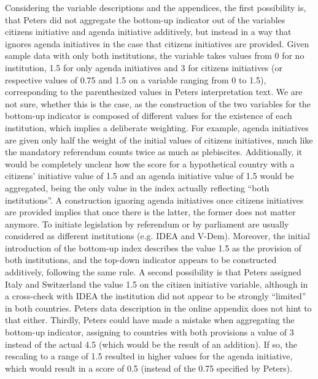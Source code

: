 \documentclass{systats}
\begin{document}
Considering the variable descriptions and the appendices, the first possibility is, that Peters did not aggregate the bottom-up indicator out of the variables citizens initiative and agenda initiative additively, but instead in a way that ignores agenda initiatives in the case that citizens initiatives are provided. Given sample data with only both institutions, the variable takes values from 0 for no institution, 1.5 for only agenda initiatives and 3 for citizens initiatives (or respective values of 0.75 and 1.5 on a variable ranging from 0 to 1.5), corresponding to the parenthesized values in Peters interpretation text. We are not sure, whether this is the case, as the construction of the two variables for the bottom-up indicator is composed of different values for the existence of each institution, which implies a deliberate weighting. For example, agenda initiatives are given only half the weight of the initial values of citizens initiatives, much like the mandatory referendum counts twice as much as plebiscites. Additionally, it would be completely unclear how the score for a hypothetical country with a citizens’ initiative value of 1.5 and an agenda initiative value of 1.5 would be aggregated, being the only value in the index actually reflecting “both institutions”. A construction ignoring agenda initiatives once citizens initiatives are provided implies that once there is the latter, the former does not matter anymore. To initiate legislation by referendum or by parliament are usually considered as different institutions (e.g. IDEA and V-Dem). Moreover, the initial introduction of the bottom-up index describes the value 1.5 as the provision of both institutions, and the top-down indicator appears to be constructed additively, following the same rule. A second possibility is that Peters assigned Italy and Switzerland the value 1.5 on the citizen initiative variable, although in a cross-check with IDEA the institution did not appear to be strongly “limited” in both countries. Peters data description in the online appendix does not hint to that either. Thirdly, Peters could have made a mistake when aggregating the bottom-up indicator, assigning to countries with both provisions a value of 3 instead of the actual 4.5 (which would be the result of an addition). If so, the rescaling to a range of 1.5 resulted in higher values for the agenda initiative, which would result in a score of 0.5 (instead of the 0.75 specified by Peters). 
\end{document}
